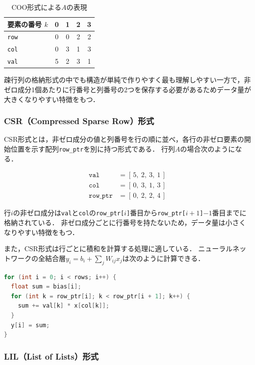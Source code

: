 \documentclass[a4paper,11pt,uplatex,dvipdfmx]{jsarticle}
\begin{document}
\begin{table}[h]
  \centering
  \caption{COO形式による$A$の表現}
  \label{tab:coo}
  \begin{tabular}{lcccc}
    \toprule
    要素の番号 $k$ & 0 & 1 & 2 & 3 \\
    \midrule
    \texttt{row} & 0 & 0 & 2 & 2 \\
    \texttt{col} & 0 & 3 & 1 & 3 \\
    \texttt{val} & 5 & 2 & 3 & 1 \\
    \bottomrule
  \end{tabular}
\end{table}

疎行列の格納形式の中でも構造が単純で作りやすく最も理解しやすい一方で，非ゼロ成分1個あたりに行番号と列番号の2つを保存する必要があるためデータ量が大きくなりやすい特徴をもつ．

\subsubsection{CSR（Compressed Sparse Row）形式}

CSR形式とは，非ゼロ成分の値と列番号を行の順に並べ，各行の非ゼロ要素の開始位置を示す配列\texttt{row\_ptr}を別に持つ形式である．
行列$A$の場合次のようになる．

\begin{align*}
  \texttt{val}     &= [\,5,\ 2,\ 3,\ 1\,] \\
  \texttt{col}     &= [\,0,\ 3,\ 1,\ 3\,] \\
  \texttt{row\_ptr} &= [\,0,\ 2,\ 2,\ 4\,]
\end{align*}

行$i$の非ゼロ成分は\texttt{val}と\texttt{col}の\texttt{row\_ptr[$i$]}番目から\texttt{row\_ptr[$i+1$]}$-1$番目までに格納されている．
非ゼロ成分ごとに行番号を持たないため，データ量は小さくなりやすい特徴をもつ．

また，CSR形式は行ごとに積和を計算する処理に適している．
ニューラルネットワークの全結合層$y_i = b_i + \sum_j W_{ij} x_j$は次のように計算できる．

\begin{lstlisting}[language=C, basicstyle=\ttfamily\small, frame=single]
for (int i = 0; i < rows; i++) {
  float sum = bias[i];
  for (int k = row_ptr[i]; k < row_ptr[i + 1]; k++) {
    sum += val[k] * x[col[k]];
  }
  y[i] = sum;
}
\end{lstlisting}

\subsubsection{LIL（List of Lists）形式}
\end{document}

